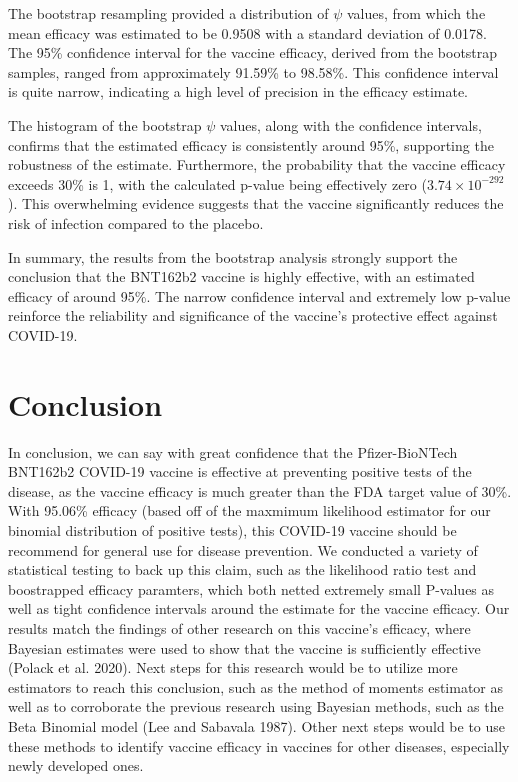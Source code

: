 \documentclass[
  11pt,
]{article}
\begin{document}
The bootstrap resampling provided a distribution of \(\psi\) values,
from which the mean efficacy was estimated to be 0.9508 with a standard
deviation of 0.0178. The 95\% confidence interval for the vaccine
efficacy, derived from the bootstrap samples, ranged from approximately
91.59\% to 98.58\%. This confidence interval is quite narrow, indicating
a high level of precision in the efficacy estimate.

The histogram of the bootstrap \(\psi\) values, along with the
confidence intervals, confirms that the estimated efficacy is
consistently around 95\%, supporting the robustness of the estimate.
Furthermore, the probability that the vaccine efficacy exceeds 30\% is
1, with the calculated p-value being effectively zero
(\(3.74 \times 10^{-292}\)). This overwhelming evidence suggests that
the vaccine significantly reduces the risk of infection compared to the
placebo.

In summary, the results from the bootstrap analysis strongly support the
conclusion that the BNT162b2 vaccine is highly effective, with an
estimated efficacy of around 95\%. The narrow confidence interval and
extremely low p-value reinforce the reliability and significance of the
vaccine's protective effect against COVID-19.

\hypertarget{conclusion}{%
\section{Conclusion}\label{conclusion}}

In conclusion, we can say with great confidence that the Pfizer-BioNTech
BNT162b2 COVID-19 vaccine is effective at preventing positive tests of
the disease, as the vaccine efficacy is much greater than the FDA target
value of 30\%. With 95.06\% efficacy (based off of the maxmimum
likelihood estimator for our binomial distribution of positive tests),
this COVID-19 vaccine should be recommend for general use for disease
prevention. We conducted a variety of statistical testing to back up
this claim, such as the likelihood ratio test and boostrapped efficacy
paramters, which both netted extremely small P-values as well as tight
confidence intervals around the estimate for the vaccine efficacy. Our
results match the findings of other research on this vaccine's efficacy,
where Bayesian estimates were used to show that the vaccine is
sufficiently effective (Polack et al. 2020). Next steps for this
research would be to utilize more estimators to reach this conclusion,
such as the method of moments estimator as well as to corroborate the
previous research using Bayesian methods, such as the Beta Binomial
model (Lee and Sabavala 1987). Other next steps would be to use these
methods to identify vaccine efficacy in vaccines for other diseases,
especially newly developed ones.
\end{document}
